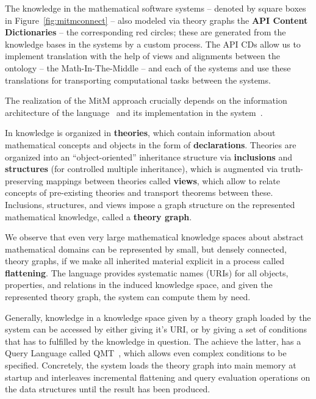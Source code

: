 The knowledge in the mathematical software systems -- denoted by square boxes in
Figure~\ref{fig:mitmconnect} -- also modeled via \ommt theory graphs the \textbf{API
  Content Dictionaries} -- the corresponding red circles; these are generated from the
knowledge bases in the systems by a custom process. The API CDs allow us to implement
translation with the help of \ommt views and alignments between the ontology -- the
Math-In-The-Middle -- and each of the systems and use these translations for transporting
computational tasks between the systems. 

The realization of the MitM approach crucially depends on the information architecture of
the \ommt language~\cite{Kohlhase:OMDoc1.2,RabKoh:WSMSML13} and its implementation in the
\mmt system~\cite{Rabe:MAGMS13,uniformal:on}.

In \ommt knowledge is organized in \textbf{theories}, which contain information about
mathematical concepts and objects in the form of \textbf{declarations}. Theories are
organized into an ``object-oriented'' inheritance structure via \textbf{inclusions} and
\textbf{structures} (for controlled multiple inheritance), which is augmented via
truth-preserving mappings between theories called \textbf{views}, which allow to relate
concepts of pre-existing theories and transport theorems between these. Inclusions,
structures, and views impose a graph structure on the represented mathematical knowledge,
called a \textbf{theory graph}. 

We observe that even very large mathematical knowledge spaces about abstract mathematical
domains can be represented by small, but densely connected, theory graphs, if we make all
inherited material explicit in a process called \textbf{flattening}. The \ommt language
provides systematic names (\mmt URIs) for all objects, properties, and relations in the
induced knowledge space, and given the represented theory graph, the \mmt system can
compute them by need. 

Generally, knowledge in a knowledge space given by a theory graph loaded by the \mmt
system can be accessed by either giving it's \mmt URI, or by giving a set of conditions
that has to fulfilled by the knowledge in question. The achieve the latter, \mmt has a
Query Language called QMT~\cite{Rabe:qlfml12}, which allows even complex conditions to be
specified. Concretely, the \mmt system loads the theory graph into main memory at startup
and interleaves incremental flattening and query evaluation operations on the \mmt data
structures until the result has been produced. 

